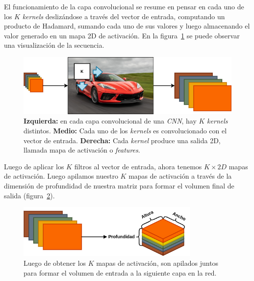 \documentclass[a4paper,12pt]{article}
\begin{document}
El funcionamiento de la capa convolucional se resume en pensar en cada uno de los $K$ \textit{kernels} deslizándose a través del vector de entrada, computando un producto de Hadamard, sumando cada uno de sus valores y luego almacenando el valor generado en un mapa 2D de activación. En la figura~\ref{fig:conv-mechanism} se puede observar una visualización de la secuencia.

\begin{figure}[H]
	\begin{center}				
	\includegraphics[width=1\textwidth]{feature-map-clean.png}
  	\caption{\textbf{Izquierda:} en cada capa convolucional de una \textit{CNN}, hay $K$ \textit{kernels} distintos. \textbf{Medio:} Cada uno de los \textit{kernels} es convolucionado con el vector de entrada. \textbf{Derecha:} Cada \textit{kernel} produce una salida 2D, llamada mapa de activación o \textit{features}.}
  	\label{fig:conv-mechanism}
  	\end{center}
\end{figure}

Luego de aplicar los $K$ filtros al vector de entrada, ahora tenemos $K \times 2D$ mapas de activación. Luego apilamos nuestro $K$ mapas de activación a través de la dimensión de profundidad de nuestra matriz para formar el volumen final de salida (figura~\ref{fig:k-maps}).

\begin{figure}[H]
	\begin{center}				
	\includegraphics[width=0.8\textwidth]{k-activation-map.png}
  	\caption{Luego de obtener los $K$ mapas de activación, son apilados juntos para formar el volumen de entrada a la siguiente capa en la red.}
  	\label{fig:k-maps}
  	\end{center}
\end{figure}
\end{document}
